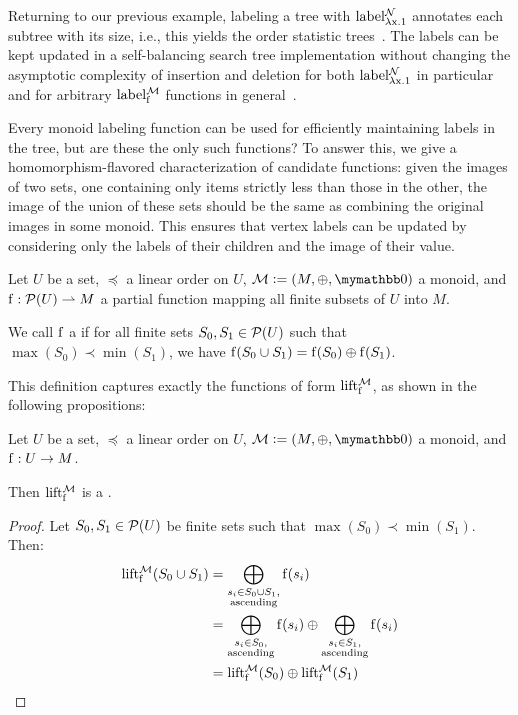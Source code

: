\documentclass[conference]{IEEEtran}
\begin{document}
Returning to our previous example, labeling a tree with $\operatorname{label_{\lambda x.1}^{\mathcal{N}}}$ annotates each subtree with its size, i.e., this yields the order statistic trees~\cite{cormen2022introduction}. The labels can be kept updated in a self-balancing search tree implementation without changing the asymptotic complexity of insertion and deletion for both $\operatorname{label_{\lambda x.1}^{\mathcal{N}}}$ in particular and for arbitrary $\operatorname{label_{\operatorname{f}}^{\mathcal{M}}}$ functions in general~\cite{cormen2022introduction}.

Every monoid labeling function can be used for efficiently maintaining labels in the tree, but are these the only such functions? To answer this, we give a homomorphism-flavored characterization of candidate functions: given the images of two sets, one containing only items strictly less than those in the other, the image of the union of these sets should be the same as combining the original images in some monoid. This ensures that vertex labels can be updated by considering only the labels of their children and the image of their value.

\begin{definition}
	Let $U$ be a set, $\preceq$ a linear order on $U$, $\mathcal{M} \defeq (M, \groupaddsym, \neutraladd)$ a monoid, and ${\operatorname{f}}: {\mathcal{P}({U})} \rightharpoonup{M}$ a partial function mapping all finite subsets of $U$ into $M$.
	
	We call $\operatorname{f}$ a  if for all finite sets $S_0, S_1 \in \mathcal{P}({U})$ such that $\max(S_0) \prec \min(S_1)$, we have $\operatorname{f}(S_0 \cup S_1) = {\operatorname{f}(S_0)} \oplus {\operatorname{f}(S_1)}$.
\end{definition}

This definition captures exactly the functions of form $\operatorname{lift_{\operatorname{f}}^{\mathcal{M}}}$, as shown in the following propositions:

\begin{proposition}
Let $U$ be a set, $\preceq$ a linear order on $U$, $\mathcal{M} \defeq (M, \groupaddsym, \neutraladd)$ a monoid, and ${\operatorname{f}}: {U} \rightarrow {M}$.

Then $\operatorname{lift_{\operatorname{f}}^{\mathcal{M}}}$ is a \somewhatmorphism{}.
\end{proposition}

\begin{proof}
Let $S_0, S_1 \in \mathcal{P}({U})$ be finite sets such that $\max(S_0) \prec \min(S_1)$. Then:
\vspace{-0.1cm}
\begin{align*}
\operatorname{lift_{\operatorname{f}}^{\mathcal{M}}}(S_0 \cup S_1) &= \bigoplus_{\substack{s_i \in S_0 \cup S_1,\\ \text{ascending}}} \operatorname{f}(s_i)\\
&= \bigoplus_{\substack{s_i \in S_0,\\ \text{ascending}}} \operatorname{f}(s_i) \oplus \bigoplus_{\substack{s_i \in S_1,\\ \text{ascending}}} \operatorname{f}(s_i)\\
&= \operatorname{lift_{\operatorname{f}}^{\mathcal{M}}}(S_0) \oplus \operatorname{lift_{\operatorname{f}}^{\mathcal{M}}}(S_1)\\
\end{align*}%
\end{proof}
\end{document}
